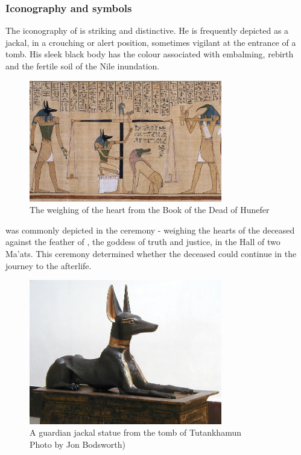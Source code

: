 \subsubsection*{Iconography and symbols}
The iconography of  is striking and distinctive. He is frequently depicted as a jackal, in a crouching or alert position, sometimes vigilant at the entrance of a tomb. His sleek black body has the colour associated with embalming, rebirth and the fertile soil of the Nile inundation.

\begin{figure} [H]
	\centering
	\includegraphics[width=0.75\textwidth]{../photos/Anubis_Hunefer}
	\caption{The weighing of the heart from the Book of the Dead of Hunefer}
\end{figure}

 was commonly depicted in the  ceremony - weighing the hearts of the deceased against the feather of , the goddess of truth and justice, in the Hall of two Ma'ats. This ceremony determined whether the deceased could continue in the journey to the afterlife.

\begin{figure} [H]
	\centering
	\includegraphics[width=0.75\textwidth]{../photos/Tutankhamun_Jackal}
	\caption{A guardian jackal statue from the tomb of Tutankhamun\\Photo by Jon Bodsworth)}
\end{figure}

